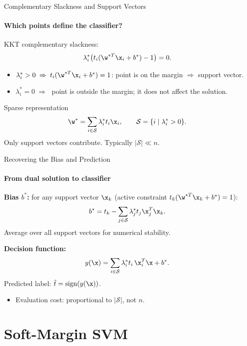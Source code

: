 \begin{frame}{Complementary Slackness and Support Vectors}
  \framesubtitle{Which points define the classifier?}
  KKT complementary slackness:
  \[
    \lambda_i^*\bigl(t_i(\w^{*T}\x_i + b^*) - 1\bigr) = 0.
  \]
  \begin{itemize}
    \item $\lambda_i^* > 0 \;\Rightarrow\; t_i(\w^{*T}\x_i+b^*) = 1$: point is on the margin $\Rightarrow$ \alert{support vector}.
    \item $\lambda_i^* = 0 \;\Rightarrow\;$ point is outside the margin; it does \alert{not} affect the solution.
  \end{itemize}
  \begin{block}{Sparse representation}
    \[
      \w^* = \sum_{i\in\mathcal{S}} \lambda_i^* t_i \x_i, \qquad
      \mathcal{S} = \{i \mid \lambda_i^* > 0\}.
    \]
    Only support vectors contribute. Typically $|\mathcal{S}| \ll n$.
  \end{block}
\end{frame}

\begin{frame}{Recovering the Bias and Prediction}
  \framesubtitle{From dual solution to classifier}
  \textbf{Bias $b^*$:} for any support vector $\x_k$ (active constraint $t_k(\w^{*T}\x_k+b^*)=1$):
  \[
    b^* = t_k - \sum_{j\in\mathcal{S}} \lambda_j^* t_j \x_j^T\x_k.
  \]
  Average over all support vectors for numerical stability.

  \vspace{0.5em}
  \textbf{Decision function:}
  \[
    y(\x) = \sum_{i\in\mathcal{S}} \lambda_i^* t_i \,\x_i^T\x + b^*.
  \]
  Predicted label: $\hat{t} = \mathrm{sign}(y(\x))$.
  \begin{itemize}
    \item Evaluation cost: proportional to $|\mathcal{S}|$, not $n$.
  \end{itemize}
\end{frame}

\section{Soft-Margin SVM}

